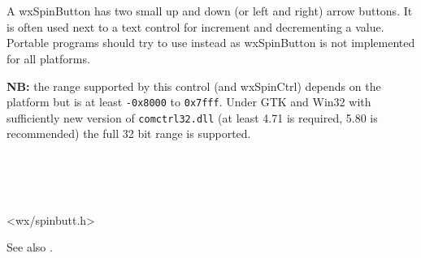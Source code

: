 \section{}\label{wxspinbutton}

A wxSpinButton has two small up and down (or left and right) arrow buttons. It
is often used next to a text control for increment and decrementing a value.
Portable programs should try to use  instead
as wxSpinButton is not implemented for all platforms.

{\bf NB:} the range supported by this control (and wxSpinCtrl) depends on the
platform but is at least {\tt -0x8000} to {\tt 0x7fff}. Under GTK and
Win32 with sufficiently new version of {\tt comctrl32.dll} (at least 4.71 is
required, 5.80 is recommended) the full 32 bit range is supported.


\\
\\
\\




<wx/spinbutt.h>


\twocolwidtha{5cm}
\begin{twocollist}\itemsep=0pt
\end{twocollist}

See also .






\label{wxspinbuttonctor}

